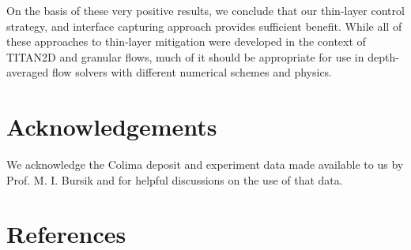 \documentclass[review]{elsarticle}
\begin{document}
%
On the basis of these very positive results, we conclude that our 
thin-layer control strategy, and interface capturing approach provides sufficient benefit. 
While all of these approaches to thin-layer mitigation were developed in the 
context of TITAN2D and granular flows, much of it should be appropriate 
for use in depth-averaged flow solvers with different numerical 
schemes and physics.

\section*{Acknowledgements}
 We acknowledge the Colima deposit  and experiment data made available to us by Prof. M. I. Bursik and for helpful discussions on the use of that data.

\section*{References}


\end{document}
